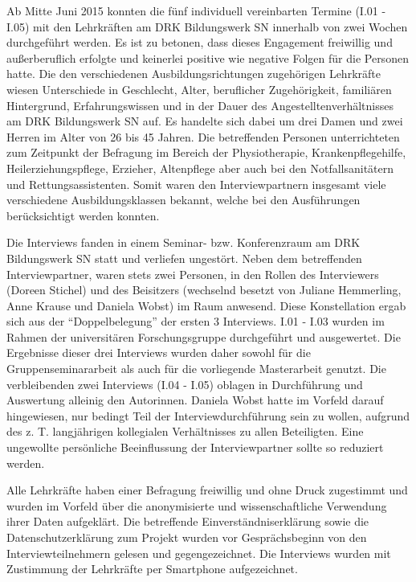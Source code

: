 Ab Mitte Juni 2015 konnten die fünf individuell vereinbarten Termine (I.01 - I.05) mit den Lehrkräften am DRK Bildungswerk SN innerhalb von zwei Wochen durchgeführt werden. Es ist zu betonen, dass dieses Engagement freiwillig und außerberuflich erfolgte und keinerlei positive wie negative Folgen für die Personen hatte. Die den verschiedenen Ausbildungsrichtungen zugehörigen Lehrkräfte wiesen Unterschiede in Geschlecht, Alter, beruflicher Zugehörigkeit, familiären Hintergrund, Erfahrungswissen und in der Dauer des Angestelltenverhältnisses am DRK Bildungswerk SN auf. Es handelte sich dabei um drei Damen und zwei Herren im Alter von 26 bis 45 Jahren. Die betreffenden Personen unterrichteten zum Zeitpunkt der Befragung im Bereich der Physiotherapie, Krankenpflegehilfe, Heilerziehungspflege, Erzieher, Altenpflege aber auch bei den Notfallsanitätern und Rettungsassistenten. Somit waren den Interviewpartnern insgesamt viele verschiedene Ausbildungsklassen bekannt, welche bei den Ausführungen berücksichtigt werden konnten.

Die Interviews fanden in einem Seminar- bzw. Konferenzraum am DRK Bildungswerk SN statt und verliefen ungestört.
Neben dem betreffenden Interviewpartner, waren stets zwei Personen, in den Rollen des Interviewers (Doreen Stichel) und des Beisitzers (wechselnd besetzt von Juliane Hemmerling, Anne Krause und Daniela Wobst) im Raum anwesend. Diese Konstellation ergab sich aus der "`Doppelbelegung"' der ersten 3 Interviews. I.01 - I.03 wurden im Rahmen der universitären Forschungsgruppe durchgeführt und ausgewertet. Die Ergebnisse dieser drei Interviews wurden daher sowohl für die Gruppenseminararbeit als auch für die vorliegende Masterarbeit genutzt. Die verbleibenden zwei Interviews (I.04 - I.05) oblagen in Durchführung und Auswertung alleinig den Autorinnen. Daniela Wobst hatte im Vorfeld darauf hingewiesen, nur bedingt Teil der Interviewdurchführung sein zu wollen, aufgrund des z. T. langjährigen kollegialen Verhältnisses zu allen Beteiligten. Eine ungewollte persönliche Beeinflussung der Interviewpartner sollte so reduziert werden.

Alle Lehrkräfte haben einer Befragung freiwillig und ohne Druck zugestimmt und wurden im Vorfeld über die anonymisierte und wissenschaftliche Verwendung ihrer Daten aufgeklärt. Die betreffende Einverständniserklärung sowie die Datenschutzerklärung zum Projekt wurden vor Gesprächsbeginn von den Interviewteilnehmern gelesen und gegengezeichnet. Die Interviews wurden mit Zustimmung der Lehrkräfte per Smartphone aufgezeichnet. 

